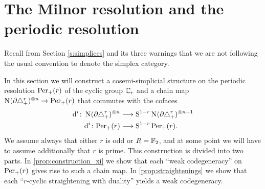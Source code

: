 
\section{The Milnor resolution and the periodic resolution}\label{s:milnor_to_per}

\begin{warning}
	Recall from Section \cref{s:simplices} and its three warnings that we are not following the usual convention to denote the simplex category.
\end{warning}

In this section we will construct a cosemi-simplicial structure on the periodic resolution $\mathrm{Per}_+(r)$ of the cyclic group $\mathbb{C}_r$ and a chain map $\operatorname{N}_{}(\partial\triangle_{+}^{r})^{\otimes n}\to \mathrm{Per}_+(r)$ that commutes with the cofaces
\begin{align*}
	\operatorname{d}^i\colon \operatorname{N}_{}(\partial\triangle_{+}^{r})^{\otimes n} & \longrightarrow \operatorname{S}^{1-r} \operatorname{N}_{}(\partial\triangle_{+}^{r})^{\otimes n+1}
	\\
	\operatorname{d}^i\colon \mathrm{Per}_+(r) &\longrightarrow \operatorname{S}^{1-r}\mathrm{Per}_+(r).
\end{align*} 
We assume always that either $r$ is odd or $R=\mathbb{F}_2$, and at some point we will have to assume additionally that $r$ is prime. This construction is divided into two parts. In \cref{prop:construction_xi} we show that each ``weak codegeneracy'' on $\mathrm{Per}_+(r)$ gives rise to such a chain map. In \cref{prop:straightenings} we show that each ``$r$-cyclic straightening with duality'' yields a weak codegeneracy.  

